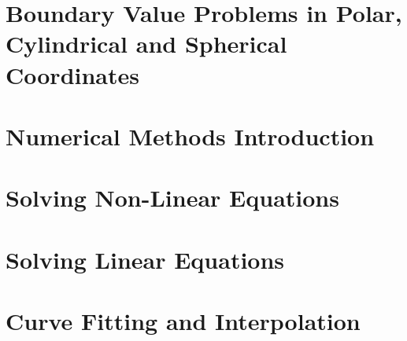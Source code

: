 \documentclass{tufte-book}
\theoremstyle{break}
\begin{document}
\part{Boundary Value Problems in Polar, Cylindrical and Spherical Coordinates}













\part{Numerical Methods Introduction}




\part{Solving Non-Linear Equations}







\part{Solving Linear Equations}










\part{Curve Fitting and Interpolation}





\end{document}

